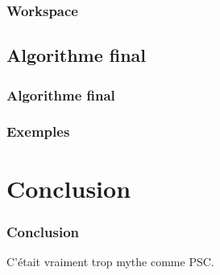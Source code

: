\documentclass[12pt, handout]{beamer}
\begin{document}
\begin{frame}
 \frametitle{Workspace}
 
 
\end{frame}

\begin{frame}
 \frametitle{}
 
 
\end{frame}

\subsection{Algorithme final}

\begin{frame}
 \frametitle{Algorithme final}
 
 
\end{frame}

\begin{frame}
 \frametitle{Exemples}
 
 
\end{frame}

\section{Conclusion}

\begin{frame}
 \frametitle{Conclusion}
 
C'était vraiment trop mythe comme PSC.
 
\end{frame}
\end{document}
